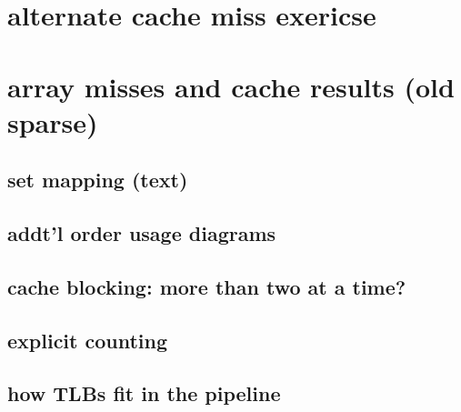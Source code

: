 \section{alternate cache miss exericse}


\section{array misses and cache results (old sparse)}


\subsection{set mapping (text)}




\subsection{addt'l order usage diagrams}

\subsection{cache blocking: more than two at a time?}

%


\subsection{explicit counting}


\subsection{how TLBs fit in the pipeline}


